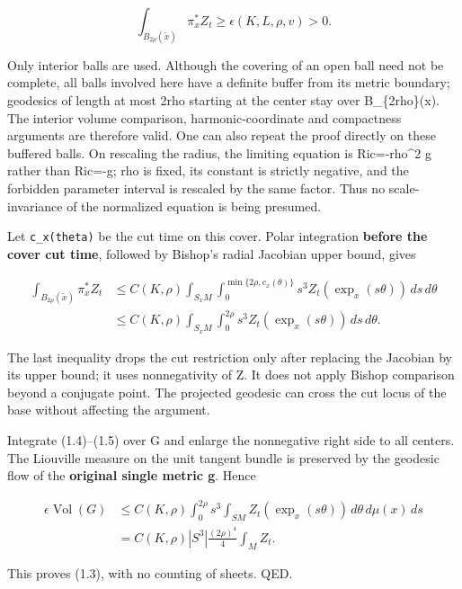 \documentclass[
  10pt,
]{article}
\begin{document}
\[
 \int_{B_{2\rho}(\tilde x)}\pi_x^*Z_t
                  \ge\epsilon(K,L,\rho,v)>0.         \tag{1.4}
\]

Only interior balls are used. Although the covering of an open ball need
not be complete, all balls involved here have a definite buffer from its
metric boundary; geodesics of length at most 2rho starting at the center
stay over B\_\{2rho\}(x). The interior volume comparison,
harmonic-coordinate and compactness arguments are therefore valid. One
can also repeat the proof directly on these buffered balls. On rescaling
the radius, the limiting equation is Ric=-rho\^{}2 g rather than Ric=-g;
rho is fixed, its constant is strictly negative, and the forbidden
parameter interval is rescaled by the same factor. Thus no
scale-invariance of the normalized equation is being presumed.

Let \texttt{c\_x(theta)} be the cut time on this cover. Polar
integration \textbf{before the cover cut time}, followed by Bishop's
radial Jacobian upper bound, gives

\[
 \begin{aligned}
 \int_{B_{2\rho}(\tilde x)}\pi_x^*Z_t
 &\le C(K,\rho)\int_{S_xM}
       \int_0^{\min\{2\rho,c_x(\theta)\}}
                    s^3Z_t(\exp_x(s\theta))\,ds\,d\theta\\
 &\le C(K,\rho)\int_{S_xM}\int_0^{2\rho}
                    s^3Z_t(\exp_x(s\theta))\,ds\,d\theta .
 \end{aligned}\tag{1.5}
\]

The last inequality drops the cut restriction only after replacing the
Jacobian by its upper bound; it uses nonnegativity of Z. It does not
apply Bishop comparison beyond a conjugate point. The projected geodesic
can cross the cut locus of the base without affecting the argument.

Integrate (1.4)--(1.5) over G and enlarge the nonnegative right side to
all centers. The Liouville measure on the unit tangent bundle is
preserved by the geodesic flow of the \textbf{original single metric g}.
Hence

\[
 \begin{aligned}
 \epsilon\operatorname{Vol}(G)
 &\le C(K,\rho)\int_0^{2\rho}s^3
    \int_{SM}Z_t(\exp_x(s\theta))\,d\theta\,d\mu(x)\,ds\\
 &=C(K,\rho)|S^3|\frac{(2\rho)^4}{4}\int_M Z_t.
 \end{aligned}\tag{1.6}
\]

This proves (1.3), with no counting of sheets. QED.
\end{document}
